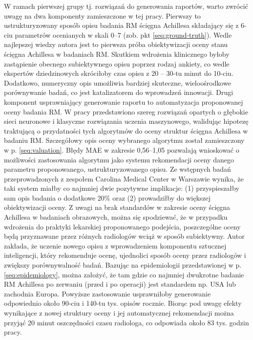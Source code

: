 W ramach pierwszej grupy tj. rozwiązań do generowania raportów, warto zwrócić uwagę na dwa komponenty zamieszczone w tej pracy. Pierwszy to ustrukturyzowany sposób opisu badania RM ścięgna Achillesa składający się z 6-ciu parametrów ocenianych w skali 0--7 (zob. pkt \ref{seq:ground-truth}). Wedle najlepszej wiedzy autora jest to pierwsza próba obiektywizacji oceny stanu ścięgna Achillesa w badaniach RM. Skutkiem wdrożenia klinicznego byłoby zastąpienie obecnego subiektywnego opisu poprzez rodzaj ankiety, co wedle ekspertów dziedzinowych skróciłoby czas opisu \linebreak z 20 -- 30-tu minut do 10-ciu. Dodatkowo, numeryczny opis umożliwia bardziej skuteczne, wieloośrodkowe porównywanie badań, co jest katalizatorem do wprowadzeń innowacji. Drugi komponent usprawniający generowanie raportu to automatyzacja proponowanej oceny badania RM. W pracy przedstawiono szereg rozwiązań opartych \linebreak o głębokie sieci neuronowe i klasyczne rozwiązania uczenia maszynowego, walidując hipotezę traktującą o przydatności tych algorytmów do oceny struktur ścięgna Achillesa w badaniu RM. Szczegółowy opis oceny wybranego algorytmu został zamieszczony w p. \ref{seq:valuation}. Błędy MAE w zakresie 0,56--1,05 pozwalają wnioskować o możliwości zastosowania algorytmu jako systemu rekomendacji oceny danego parametru proponowanego, ustrukturyzowanego opisu. Ze wstępnych badań przeprowadzonych z zespołem Carolina Medical Center w Warszawie wynika, że taki system miałby \linebreak co najmniej dwie pozytywne implikacje: (1) przyspieszałby sam opis badania o dodatkowe 20\% oraz (2) prowadziłby do większej obiektywizacji oceny. Z uwagi na brak standardów w zakresie oceny ścięgna Achillesa w badaniach obrazowych, można się spodziewać, że w przypadku wdrożenia do praktyki lekarskiej proponowanego podejścia, poszczególne oceny będą przyznawane przez różnych radiologów wciąż w sposób subiektywny. Autor zakłada, że uczenie nowego opisu z wprowadzeniem komponentu sztucznej inteligencji, który rekomenduje ocenę, ujednolici sposób oceny przez radiologów i zwiększy porównywalność badań. Bazując na epidemiologii przedstawionej w p. \ref{seq:epidemiology}, można założyć, że tam gdzie co najmniej dwukrotne badanie RM Achillesa po zerwaniu (przed i po operacji) jest standardem np. USA lub zachodnia Europa. Powyższe zastosowanie usprawniłoby generowanie odpowiednio około 90-ciu i 140-tu tys. opisów rocznie. Biorąc pod uwagę efekty wynikające \linebreak z nowej struktury oceny i jej automatycznej rekomendacji można przyjąć 20 minut oszczędności czasu radiologa, co odpowiada około 83 tys. godzin pracy.

